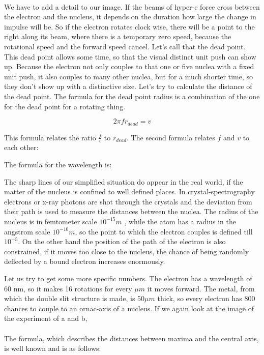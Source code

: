 \paragraph{}
We have to add a detail to our image. If the beams of hyper-c force cross between the electron and the nucleus, it depends on the duration how large the change in impulse will be. So if the electron rotates clock wise, there will be a point to the right along its beam, where there is a temporary zero speed, because the rotational speed and the forward speed cancel. Let's call that the dead point. This dead point allows some time, so that the visual distinct unit push can show up. Because the electron not only couples to that one or five nuclea with a fixed unit push, it also couples to many other nuclea, but for a much shorter time, so they don't show up with a distinctive size. Let's try to calculate the distance of the dead point.
The formula for the dead point radius is a combination of the one for the dead point for a rotating thing.

\[2\pi f r_{dead} = v\]

This formula relates the ratio $\frac{f}{v}$ to $r_{dead}$. The second formula relates $f$ and $v$  to each other:

The formula for the wavelength is:

The sharp lines of our simplified situation do appear in the real world, if the matter of the nucleus is confined to well defined places. In crystal-spectrography electrons or x-ray photons are shot through the crystals and the deviation from their path is used to measure the distances between the nuclea. The radius of the nucleus is in femtometer scale $10^{-15} m$ , while the atom has a radius in the angstrom scale $10^{-10} m$, so the point to which the electron couples is defined till $10^{-5}$. On the other hand the position of the path of the electron is also constrained, if it moves too close to the nucleus, the chance of being randomly deflected by a bound electron increases enormously.

Let us try to get some more specific numbers. The electron has a wavelength of 60 nm, so it makes 16 rotations for every $\mu m$ it moves forward. The metal, from which the double slit structure is made, is $50 \mu m$ thick, so every electron has 800 chances to couple to an ornac-axis of a nucleus. If we again look at the image of the experiment of a and b,

\paragraph{}
The formula, which describes the distances between maxima and the central axis, is well known and is as follows:

